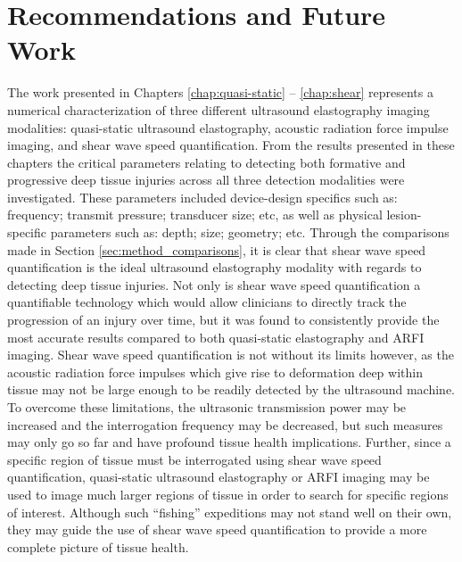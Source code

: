 	\section{Recommendations and Future Work}
		The work presented in Chapters \ref{chap:quasi-static} -- \ref{chap:shear} represents a numerical characterization of three different ultrasound elastography imaging modalities: quasi-static ultrasound elastography, acoustic radiation force impulse imaging, and shear wave speed quantification. From the results presented in these chapters the critical parameters relating to detecting both formative and progressive deep tissue injuries across all three detection modalities were investigated. These parameters included device-design specifics such as: frequency; transmit pressure; transducer size; etc, as well as physical lesion-specific parameters such as: depth; size; geometry; etc. Through the comparisons made in Section \ref{sec:method_comparisons}, it is clear that shear wave speed quantification is the ideal ultrasound elastography modality with regards to detecting deep tissue injuries. Not only is shear wave speed quantification a quantifiable technology which would allow clinicians to directly track the progression of an injury over time, but it was found to consistently provide the most accurate results compared to both quasi-static elastography and ARFI imaging. Shear wave speed quantification is not without its limits however, as the acoustic radiation force impulses which give rise to deformation deep within tissue may not be large enough to be readily detected by the ultrasound machine. To overcome these limitations, the ultrasonic transmission power may be increased and the interrogation frequency may be decreased, but such measures may only go so far and have profound tissue health implications. Further, since a specific region of tissue must be interrogated using shear wave speed quantification, quasi-static ultrasound elastography or ARFI imaging may be used to image much larger regions of tissue in order to search for specific regions of interest. Although such ``fishing'' expeditions may not stand well on their own, they may guide the use of shear wave speed quantification to provide a more complete picture of tissue health.

